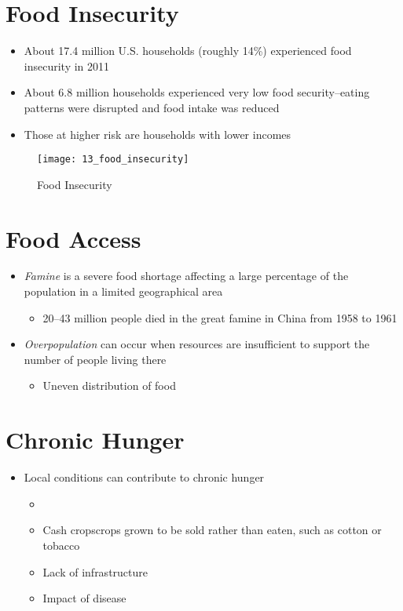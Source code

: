 \documentclass[title={Chapter 13}]{fdsn201notes}
\begin{document}
%
%
%

\section{Food Insecurity}\label{sec:food-insecurity}
\begin{itemize}
	\item About 17.4 million U.S. households (roughly 14\%) experienced food insecurity in 2011
	\item About 6.8 million households experienced very low food security--eating patterns were disrupted and food intake was reduced
	\item Those at higher risk are households with lower incomes
\end{itemize}

\begin{figure}[H]
	\centering
	\texttt{[image: 13\_food\_insecurity]}
	\caption{Food Insecurity}
	\label{fig:food-insecurity}
\end{figure}

\section{Food Access}\label{sec:food-access}
\begin{itemize}
	\item \emph{Famine} is a severe food shortage affecting a large percentage of the population in a limited geographical area
	\begin{itemize}
		\item 20–43 million people died in the great famine in China from 1958 to 1961
	\end{itemize}
	\item \emph{Overpopulation} can occur when resources are insufficient to support the number of people living there
	\begin{itemize}
		\item Uneven distribution of food
	\end{itemize}
\end{itemize}

\section{Chronic Hunger}\label{sec:chronic-hunger}
\begin{itemize}
	\item Local conditions can contribute to chronic hunger
	\begin{itemize}
		\item \item{Cash crops}{crops grown to be sold rather than eaten, such as cotton or tobacco}
		\item Lack of infrastructure
		\item Impact of disease
	\end{itemize}
\end{itemize}
\end{document}
